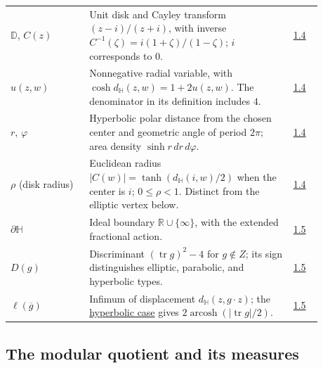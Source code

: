 \begin{longtable}{p{0.22\linewidth}p{0.58\linewidth}p{0.08\linewidth}}
$\mathbb D$, $C(z)$ & Unit disk and Cayley transform $(z-i)/(z+i)$, with inverse $C^{-1}(\zeta)=i(1+\zeta)/(1-\zeta)$; $i$ corresponds to $0$. & \hyperref[hyperbolic.cayley]{1.4} \\
$u(z,w)$ & Nonnegative radial variable, with $\cosh d_{\mathbb H}(z,w)=1+2u(z,w)$. The denominator in its definition includes $4$. & \hyperref[hyperbolic.point-pair]{1.4} \\
$r$, $\varphi$ & Hyperbolic polar distance from the chosen center and geometric angle of period $2\pi$; area density $\sinh r\,dr\,d\varphi$. & \hyperref[hyperbolic.polar-coordinates]{1.4} \\
$\rho$ (disk radius) & Euclidean radius $|C(w)|=\tanh(d_{\mathbb H}(i,w)/2)$ when the center is $i$; $0\leq\rho<1$. Distinct from the elliptic vertex below. & \hyperref[hyperbolic.polar-coordinates]{1.4} \\
$\partial\mathbb H$ & Ideal boundary $\mathbb R\cup\{\infty\}$, with the extended fractional action. & \hyperref[v1a-ch01-s8]{1.5} \\
$D(g)$ & Discriminant $(\operatorname{tr}g)^2-4$ for $g\notin Z$; its sign distinguishes elliptic, parabolic, and hyperbolic types. & \hyperref[hyperbolic.types]{1.5} \\
$\ell(\overline g)$ & Infimum of displacement $d_{\mathbb H}(z,g\cdot z)$; the \hyperref[hyperbolic.hyperbolic-length]{hyperbolic case} gives $2\operatorname{arcosh}(|\operatorname{tr}g|/2)$. & \hyperref[hyperbolic.translation-length]{1.5} \\
\end{longtable}

\subsection*{The modular quotient and its measures}\label{v1a-notation-modular}

